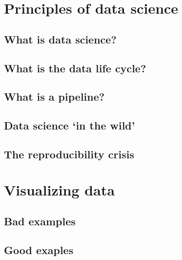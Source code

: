 \documentclass[
]{book}
\begin{document}
\hypertarget{principles-of-data-science}{%
\chapter{Principles of data science}\label{principles-of-data-science}}

\hypertarget{what-is-data-science}{%
\section{What is data science?}\label{what-is-data-science}}

\hypertarget{what-is-the-data-life-cycle}{%
\section{What is the data life cycle?}\label{what-is-the-data-life-cycle}}

\hypertarget{what-is-a-pipeline}{%
\section{What is a pipeline?}\label{what-is-a-pipeline}}

\hypertarget{data-science-in-the-wild}{%
\section{Data science `in the wild'}\label{data-science-in-the-wild}}

\hypertarget{the-reproducibility-crisis}{%
\section{The reproducibility crisis}\label{the-reproducibility-crisis}}

\hypertarget{visualizing-data}{%
\chapter{Visualizing data}\label{visualizing-data}}

\hypertarget{bad-examples}{%
\section{Bad examples}\label{bad-examples}}

\hypertarget{good-exaples}{%
\section{Good exaples}\label{good-exaples}}
\end{document}
